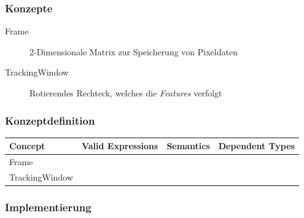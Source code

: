 \documentclass{beamer}
\begin{document}
\begin{frame}
\frametitle{Konzepte}
    \begin{description}
        \item[Frame] 2-Dimensionale Matrix zur Speicherung von Pixeldaten \cite{OpenCVcv11:online}
        \item[TrackingWindow] Rotierendes Rechteck, welches die \textit{Features} verfolgt \cite{OpenCVcv94:online}
    \end{description}
\end{frame}

\begin{frame}
\frametitle{Konzeptdefinition}\centering
    \begin{table}[]
    \begin{tabular}{l|l|l|l}
    \textbf{Concept}  & \textbf{Valid Expressions} & \textbf{Semantics} & \textbf{Dependent Types} \\\hline
    \multirow{2}{*}{Frame} &                            &                    &                          \\
                  &                            &                    &                                   \\\hline
    \multirow{2}{*}{TrackingWindow} &                            &                    &                          \\
                  &                            &                    &
    \end{tabular}
    \end{table}
\end{frame}

\begin{frame}
\frametitle{Implementierung}
\end{frame}
\end{document}
